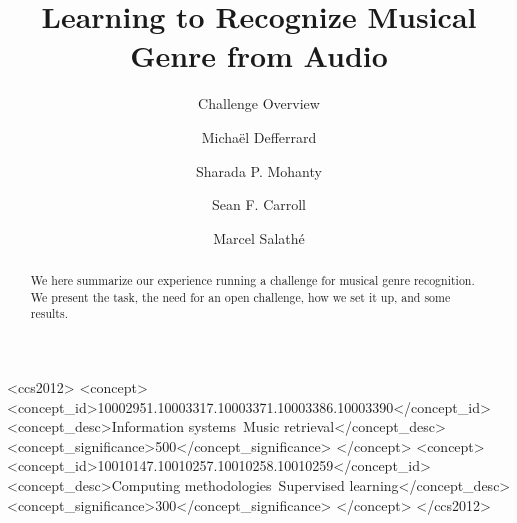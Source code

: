 \documentclass[sigconf]{acmart}
\begin{document}
\title{Learning to Recognize Musical Genre from Audio}
\subtitle{Challenge Overview}


\author{Michaël Defferrard}

\author{Sharada P. Mohanty}

\author{Sean F. Carroll}

\author{Marcel Salathé}



\begin{abstract}
	We here summarize our experience running a challenge for musical genre recognition. We present the task, the need for an open challenge, how we set it up, and some results.
\end{abstract}


 \begin{CCSXML}
<ccs2012>
  <concept>
    <concept_id>10002951.10003317.10003371.10003386.10003390</concept_id>
    <concept_desc>Information systems~Music retrieval</concept_desc>
    <concept_significance>500</concept_significance>
  </concept>
  <concept>
    <concept_id>10010147.10010257.10010258.10010259</concept_id>
    <concept_desc>Computing methodologies~Supervised learning</concept_desc>
    <concept_significance>300</concept_significance>
  </concept>
</ccs2012>
\end{CCSXML}
\end{document}
